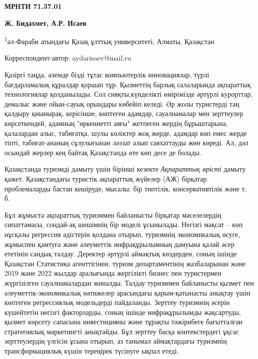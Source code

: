 \newpage
{\bfseries МРНТИ 71.37.01}


\begin{center}
{\bfseries Ж. Бидахмет, А.Р. Исаев}

\textsuperscript{1}әл-Фараби атындағы Қазақ ұлттық университеті, Алматы,
Қазақстан

Корреспондент-автор: aydarisaev@mail.ru
\end{center}

Қазіргі таңда, әлемде бізді тұтас компьютерлік инновациялар, түрлі
бағдарламалық құралдар қоршап тұр. Қызметтің барлық салаларында
ақпараттық технологиялар қолданылады. Сол сияқты,күнделікті өмірімізде
әртүрлі курорттар, демалыс және ойын-сауық орындары көбейіп келеді. Әр
жолы туристерді таң қалдыру қиынырақ, керісінше, көптеген адамдар,
сауалнамалар мен зерттеулер көрсеткендей, адамның "өркениетті аяғы"
жетпеген жердің бұрыштарына, қалалардан алыс, табиғатқа, шулы көліктер
жоқ жерде, адамдар көп емес жерде тіпті, табиғат-ананың сұлулығынан
ләззат алып саяхаттауды жөн көреді. Ал, дәл осындай жерлер кең байтақ
Қазақстанда өте көп десе де болады.

Қазақстанда туризмді дамыту үшін бірінші кезекте \emph{Ақпараттық
өрісті} дамыту қажет. Қазақстандағы туристік ақпараттық жүйелер (АЖ)
бірқатар проблемаларды бастан кешіруде, мысалы: бір типтілік,
консервативтілік және т. б.

Бұл жұмыста ақпараттық туризммен байланысты бірқатар мәселелердің
сипаттамасы, сондай-ақ шешімнің бір моделі ұсынылады. Негізгі мақсат --
көп нұсқалы регрессия әдістерін қолдана отырып, туризмнің экономикалық
өсуге, жұмыспен қамтуға және әлеуметтік инфрақұрылымның дамуына қалай
әсер ететінін сандық талдау. Деректер әртүрлі аймақтық көздерден, соның
ішінде Қазақстан Статистика агенттігінен, туризм департаментінің
жазбаларынан және 2019 және 2022 жылдар аралығында жергілікті бизнес пен
туристермен жүргізілген сауалнамалардан жиналды. Талдау туризммен
байланысты қызмет пен әлеуметтік-экономикалық нәтижелер арасындағы
қарым-қатынасты анықтау үшін көптеген регрессиялық модельдерді
пайдаланды. Зерттеу туризмнің әсерін күшейтетін негізгі факторларды,
соның ішінде инфрақұрылымды жақсартуды, қызмет көрсету сапасына
инвестицияны және тұрақты тәжірибеге бағытталған стратегиялық
маркетингті анықтайды. Бұл зерттеу басқа контекстердегі ұқсас
зерттеулердің үлгісін ұсына отырып, аз танымал аймақтардағы туризмнің
трансформациялық күшін тереңірек түсінуге ықпал етеді.

